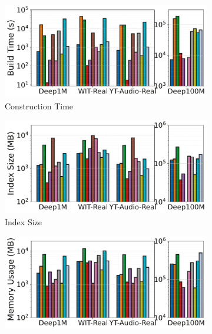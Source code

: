 \documentclass[sigconf, nonacm, pdfa]{acmart}
\begin{document}
{\begin{figure}[t]
		\begin{subfigure}[t]{0.495\columnwidth}
			\centering
			\captionsetup{font=small}
			\includegraphics[width=\linewidth]{figures/indexData/rangeFilter_build_time_comparison_query.pdf}
			\caption{\footnotesize Construction Time}
			\label{fig:rangeFilter_build_time}
		\end{subfigure}
		\hfill
		\begin{subfigure}[t]{0.495\columnwidth}
			\centering
			\includegraphics[width=\linewidth]{figures/indexData/rangeFilter_index_size_mb_comparison_query.pdf}
			\caption{\footnotesize Index Size}
			\label{fig:rangeFilter_index_size_mb}
		\end{subfigure}
		\hfill
		\begin{subfigure}[t]{0.495\columnwidth}
			\centering
			\includegraphics[width=\linewidth]{figures/indexData/rangeFilter_memory_mb_comparison_query.pdf}

\end{subfigure}
\end{figure}}
\end{document}
